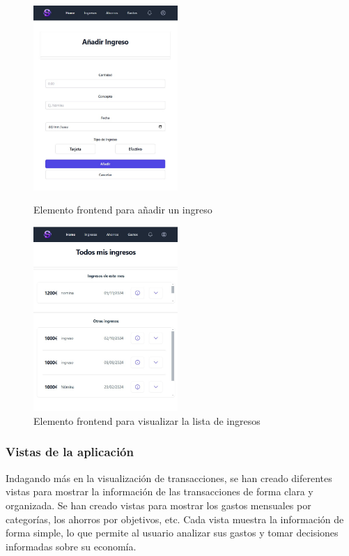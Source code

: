 \begin{figure}[ht!]
    \centering
    \begin{minipage}{0.45\textwidth}
        \centering
        \includegraphics[height = 70mm]{imagenes/ingreso_form.jpg}
        \caption{Elemento frontend para añadir un ingreso}
        \label{fig:ingreso_form}
    \end{minipage}\hfill
    \begin{minipage}{0.45\textwidth}
        \centering
        \includegraphics[height = 70mm]{imagenes/ingreso_lista.jpg}
        \caption{Elemento frontend para visualizar la lista de ingresos}
        \label{fig:ingreso_lista}
    \end{minipage}
\end{figure}


\subsubsection{Vistas de la aplicación}
Indagando más en la visualización de transacciones, se han creado diferentes vistas para mostrar la información de las transacciones de forma clara y organizada. Se han creado vistas para mostrar los gastos mensuales por categorías, los ahorros por objetivos, etc. Cada vista muestra la información de forma simple, lo que permite al usuario analizar sus gastos y tomar decisiones informadas sobre su economía.


